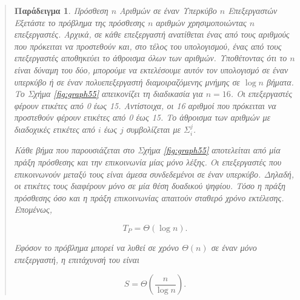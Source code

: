 \documentclass[12pt,a4paper]{article}
\newtheorem{paradeigma}{Παράδειγμα}
\begin{document}
\begin{quote}
\begin{paradeigma} \label{par:4} Πρόσθεση $n$ Αριθμών σε έναν Υπερκύβο $n$ Επεξεργαστών
Εξετάστε το πρόβλημα της πρόσθεσης $n$ αριθμών χρησιμοποιώντας $n$
επεξεργαστές. Αρχικά, σε κάθε επεξεργαστή ανατίθεται ένας από τους
αριθμούς που πρόκειται να προστεθούν και, στο τέλος του υπολογισμού,
ένας από τους επεξεργαστές αποθηκεύει το άθροισμα όλων των αριθμών.
Υποθέτοντας ότι το $n$ είναι δύναμη του δύο, μπορούμε να εκτελέσουμε
αυτόν τον υπολογισμό σε έναν υπερκύβο ή σε έναν πολυεπεξεργαστή 
διαμοιραζόμενης μνήμης σε $\log n$ βήματα. Το Σχήμα \ref{fig:graph55} 
απεικονίζει τη διαδικασία για $n = 16$. Οι επεξεργαστές φέρουν ετικέτες 
από 0 έως 15. Αντίστοιχα, οι 16 αριθμοί που πρόκειται να προστεθούν φέρουν
ετικέτες από 0 έως 15. Το άθροισμα των αριθμών με διαδοχικές ετικέτες από 
$i$ έως $j$ συμβολίζεται με $\Sigma_i^j$.

Κάθε βήμα που παρουσιάζεται στο Σχήμα \ref{fig:graph55} αποτελείται από 
μία πράξη πρόσθεσης και την επικοινωνία μίας μόνο λέξης. Οι επεξεργαστές 
που επικοινωνούν μεταξύ τους είναι άμεσα συνδεδεμένοι σε έναν υπερκύβο.
Δηλαδή, οι ετικέτες τους διαφέρουν μόνο σε μία θέση δυαδικού ψηφίου.
Τόσο η πράξη πρόσθεσης όσο και η πράξη επικοινωνίας απαιτούν σταθερό
χρόνο εκτέλεσης. Επομένως,

\begin{equation}
T_P = \Theta(\log n).
\label{eq:relation19}
\end{equation}

\noindent Εφόσον το πρόβλημα μπορεί να λυθεί σε χρόνο $\Theta(n)$ σε έναν 
μόνο επεξεργαστή, η επιτάχυνσή του είναι

\begin{equation}
S = \Theta\!\left(\frac{n}{\log n}\right).
\label{eq:relation20}
\end{equation}

\end{paradeigma}
\end{quote}
\end{document}
